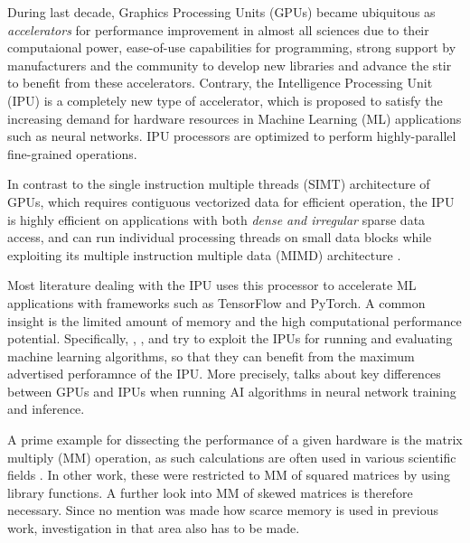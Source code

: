 \documentclass[a4paper,UKenglish,cleveref, autoref, thm-restate]{oasics-v2021}
\begin{document}
During last decade, Graphics Processing Units (GPUs) became ubiquitous as \textit{accelerators} for performance improvement in almost all sciences due to their computaional power, ease-of-use capabilities for programming, strong support by manufacturers and the community to develop new libraries and advance the stir to benefit from these accelerators.
Contrary, the Intelligence Processing Unit (IPU) is a completely new type of accelerator, which is proposed to satisfy the increasing demand for hardware resources in Machine Learning (ML) applications such as neural networks. 
IPU processors are optimized to perform highly-parallel fine-grained operations. 

In contrast to the single instruction multiple threads (SIMT) architecture of GPUs, which requires contiguous vectorized data for efficient operation, the IPU is highly efficient on applications with both \textit{dense and irregular} sparse data access, and can run individual processing threads on small data blocks while exploiting its multiple instruction multiple data (MIMD) architecture \cite{ipu1}.

Most literature dealing with the IPU uses this processor to accelerate ML applications with frameworks such as TensorFlow and PyTorch. %
A common insight is the limited amount of memory and the high computational performance potential. Specifically, \cite{ipu_ML_bench1}, \cite{Dyn_Sparse}, and \cite{Qwant} try to exploit the IPUs for running and evaluating machine learning algorithms, so that they can benefit from the maximum advertised perforamnce of the IPU. More precisely,   \cite{ipu_ML_bench1} talks about key differences between GPUs and IPUs when running AI algorithms in neural network training and inference.


A prime example for dissecting the performance of a given hardware is the matrix multiply (MM) operation, as such calculations are often used in various scientific fields  \cite{GEMM}. In other work, these were restricted to MM of squared matrices by using library functions. A further look into MM of skewed matrices is therefore necessary. Since no mention was made how scarce memory is used in previous work, investigation in that area also has to be made.
\end{document}
